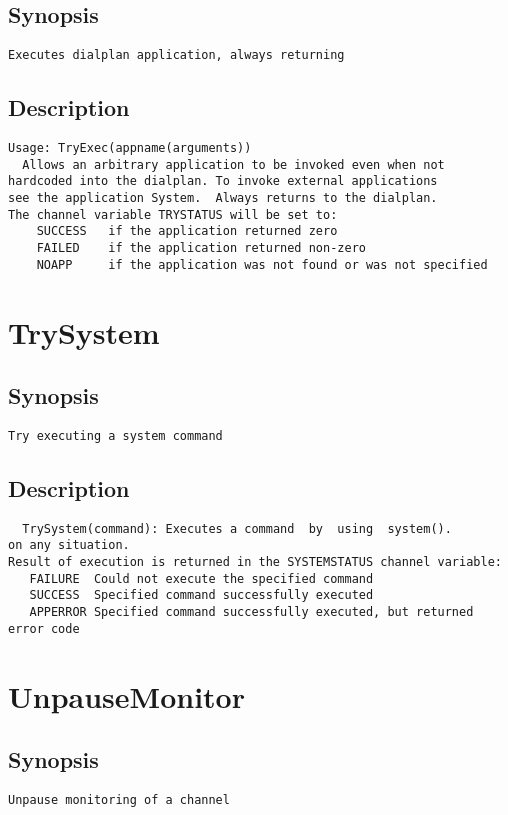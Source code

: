 \subsection{Synopsis}
\begin{verbatim}
Executes dialplan application, always returning
\end{verbatim}
\subsection{Description}
\begin{verbatim}
Usage: TryExec(appname(arguments))
  Allows an arbitrary application to be invoked even when not
hardcoded into the dialplan. To invoke external applications
see the application System.  Always returns to the dialplan.
The channel variable TRYSTATUS will be set to:
    SUCCESS   if the application returned zero
    FAILED    if the application returned non-zero
    NOAPP     if the application was not found or was not specified

\end{verbatim}


\section{TrySystem}
\subsection{Synopsis}
\begin{verbatim}
Try executing a system command
\end{verbatim}
\subsection{Description}
\begin{verbatim}
  TrySystem(command): Executes a command  by  using  system().
on any situation.
Result of execution is returned in the SYSTEMSTATUS channel variable:
   FAILURE	Could not execute the specified command
   SUCCESS	Specified command successfully executed
   APPERROR	Specified command successfully executed, but returned error code

\end{verbatim}


\section{UnpauseMonitor}
\subsection{Synopsis}
\begin{verbatim}
Unpause monitoring of a channel
\end{verbatim}
